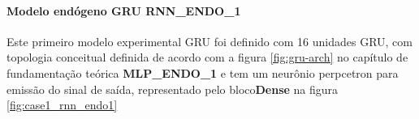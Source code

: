          \paragraph{Modelo endógeno GRU RNN\_ENDO\_1}
            Este primeiro modelo experimental GRU foi definido com 16 unidades GRU, com topologia conceitual definida de acordo com a figura \ref{fig:gru-arch} no capítulo de fundamentação teórica \textbf{MLP\_ENDO\_1} e tem um neurônio perpcetron para emissão do sinal de saída, representado pelo bloco\textbf{Dense} na figura \ref{fig:case1_rnn_endo1}
            \begin{figure}[H]
            \end{figure}
         
